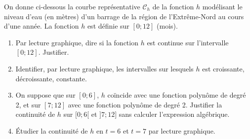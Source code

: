 \documentclass[11pt]{article}
\begin{document}
\begin{exercice}
On donne ci-dessous la courbe représentative $\mathcal{C}_h$ de la fonction $h$ modélisant le niveau d'eau (en mètres) d'un barrage de la région de l'Extrême-Nord au cours d'une année. La fonction $h$ est définie sur $[0 ; 12]$ (mois).
\begin{center}
\end{center}
\begin{enumerate}
    \item Par lecture graphique, dire si la fonction $h$ est continue sur l'intervalle $[0 ; 12]$. Justifier.
    \item Identifier, par lecture graphique, les intervalles sur lesquels $h$ est croissante, décroissante, constante.
    \item On suppose que sur $[0 ; 6]$, $h$ coïncide avec une fonction polynôme de degré 2, et sur $[7 ; 12]$ avec une fonction polynôme de degré 2. Justifier la continuité de $h$ sur $[0 ; 6[$ et $]7 ; 12]$ sans calculer l'expression algébrique.
    \item Étudier la continuité de $h$ en $t=6$ et $t=7$ par lecture graphique.
\end{enumerate}
\end{exercice}
\end{document}
